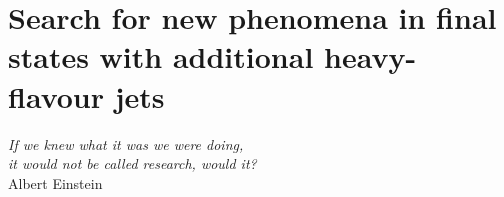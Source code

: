 \chapter[Search for new phenomena in \boldmath{$t\bar{t}$} final states with additional heavy-flavour jets]{Search for new phenomena in  final states with additional heavy-flavour jets}
\label{chp:VLQ}

\begin{flushright}
\begin{small}
\emph{If we knew what it was we were doing,\\ it would not be called research, would it?\\}
Albert Einstein
\end{small}
\end{flushright}

\minitoc












